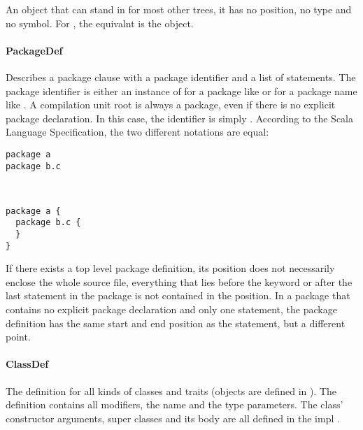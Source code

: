 \noindent An object that can stand in for most other trees, it has no position, no type and no symbol. For , the equivalnt is the  object.

\paragraph{PackageDef} 

\noindent Describes a package clause with a package identifier and a list of statements. The package identifier is either an instance of  for a package like  or  for a package name like . A compilation unit root is always a package, even if there is no explicit package declaration. In this case, the identifier is simply . According to the Scala Language Specification, the two different notations are equal:

\begin{multicols}{2}
\begin{lstlisting}
package a
package b.c
  
  
\end{lstlisting}

\begin{lstlisting}
package a {
  package b.c {
  }
}
\end{lstlisting}
\end{multicols}


If there exists a top level package definition, its position does not necessarily enclose the whole source file, everything that lies before the  keyword or after the last statement in the package is not contained in the position. In a package that contains no explicit package declaration and only one statement, the package definition has the same start and end position as the statement, but a different point.

\paragraph{ClassDef} 

\noindent The definition for all kinds of classes and traits (objects are defined in ). The definition contains all modifiers, the name and the type parameters. The class' constructor arguments, super classes and its body are all defined in the impl .

